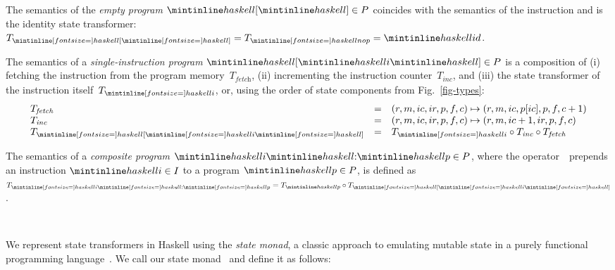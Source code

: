     The semantics of the \emph{empty program} $\hs{[}\hs{]} \in P$ coincides with
    the semantics of the instruction  and is the identity state transformer:
    $T_{\subhs{[}\subhs{]}} = T_{\subhs{nop}} = \hs{id}$.

    The semantics of a \emph{single-instruction program} $\hs{[}\hs{i}\hs{]} \in P$
    is a composition of (i) fetching the instruction from
    the program memory~$T_\textit{fetch}$, (ii) incrementing the
    instruction counter~$T_\textit{inc}$, and (iii) the state transformer
    of the instruction itself~$T_{\subhs{i}}$, or, using the order of state
    components from Fig.~\ref{fig-types}:
    \vspace{-1mm}
    \[
    \begin{array}{lcl}
    T_\textit{fetch} & = & (r, m, ic, ir, p, f, c) \mapsto (r, m, ic, p[ic], p, f, c + 1)\\
    T_\textit{inc} & = & (r, m, ic, ir, p, f, c) \mapsto (r, m, ic + 1, ir, p, f, c)\\
    T_{\subhs{[}\subhs{i}\subhs{]}} & = & T_{\subhs{i}} \circ T_\textit{inc} \circ T_\textit{fetch}\\
    \end{array}
    \]

    The semantics of a \emph{composite program} $\hs{i}\hs{:}\hs{p} \in P$,
    where the operator~\hs{:}~prepends an instruction $\hs{i} \in I$ to a program
    $\hs{p} \in P$, is defined as $T_{\subhs{i}\subhs{:}\subhs{p}} = T_{\hs{p}} \circ T_{\subhs{[}\subhs{i}\subhs{]}}$.


\vspace{-2mm}
\noindent\hrulefill~\\
\vspace{-3mm}

We represent state transformers in Haskell using the \emph{state monad}, a
classic approach to emulating mutable state in a purely functional programming
language~\cite{wadler1990comprehending}. We call our state monad~ and
define it as follows:

